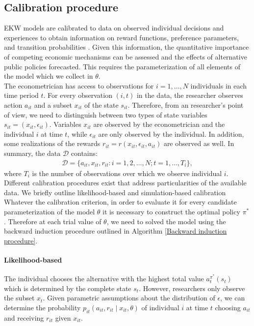 \subsection{Calibration procedure}\label{Estimation}
EKW models are calibrated to data on observed individual decisions and experiences to obtain information on reward functions, preference parameters, and transition probabilities \citep{Davidson.2003,Gourieroux.1996}. Given this information, the quantitative importance of competing economic mechanisms can be assessed and the effects of alternative public policies forecasted. This requires the parameterization of all elements of the model which we collect in $\theta$.\\

\noindent The econometrician has access to observations for $i = 1, \hdots, N$ individuals in each time period $t$. For every observation $(i, t)$ in the data, the researcher observes action $a_{it}$ and a subset $x_{it}$ of the state $s_{it}$. Therefore, from an researcher's point of view, we need to distinguish between two types of state variables $s_{it} = (x_{it}, \epsilon_{it})$. Variables $x_{it}$ are observed by the econometrician and the individual $i$ at time $t$, while $\epsilon_{it}$ are only observed by the individual. In addition, some realizations of the rewards $r_{it} = r(x_{it}, \epsilon_{it}, a_{it})$ are observed as well. In summary, the data $\mathcal{D}$ contains:
%
\begin{align*}
  \mathcal{D} = \{a_{it}, x_{it}, r_{it}: i = 1,2, \hdots, N; t = 1, \hdots, T_i\},
\end{align*}
where $T_i$ is the number of observations over which we observe individual $i$.\\

\noindent Different calibration procedures exist that address particularities of the available data. We briefly outline likelihood-based and simulation-based calibration  Whatever the calibration criterion, in order to evaluate it for every candidate parameterization of the model $\theta$ it is necessary to construct the optimal policy $\pi^*$. Therefore at each trial value of $\theta$, we need to solved the model using the backward induction procedure outlined in Algorithm \ref{Backward induction procedure}.

\paragraph{Likelihood-based} The individual chooses the alternative with the highest total value $a_t^{\pi^*}(s_t)$ which is determined by the complete state $s_t$. However, researchers only observe the subset $x_t$. Given parametric assumptions about the distribution of $\epsilon$, we can determine the probability $p_{it}(a_{it}, r_{it} \mid x_{it}, \theta)$ of individual $i$ at time $t$ choosing $a_{it}$ and receiving $r_{it}$ given $x_{it}$.\\

